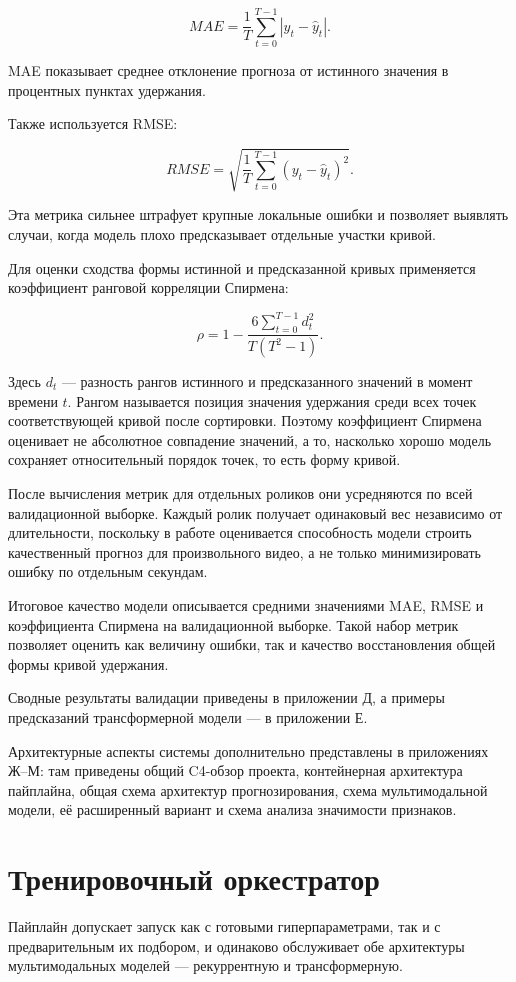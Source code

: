 \documentclass[times]{itmo-student-thesis}
\begin{document}
\[
MAE=\frac{1}{T}\sum_{t=0}^{T-1}|y_t-\hat y_t|.
\]

MAE показывает среднее отклонение прогноза от истинного значения в процентных пунктах удержания.

Также используется RMSE:

\[
RMSE=\sqrt{\frac{1}{T}\sum_{t=0}^{T-1}(y_t-\hat y_t)^2}.
\]

Эта метрика сильнее штрафует крупные локальные ошибки и позволяет выявлять случаи, когда модель плохо предсказывает отдельные участки кривой.

Для оценки сходства формы истинной и предсказанной кривых применяется коэффициент ранговой корреляции Спирмена:

\[
\rho=1-\frac{6\sum_{t=0}^{T-1}d_t^2}{T(T^2-1)}.
\]

Здесь $d_t$ — разность рангов истинного и предсказанного значений в момент времени $t$. Рангом называется позиция значения удержания среди всех точек соответствующей кривой после сортировки. Поэтому коэффициент Спирмена оценивает не абсолютное совпадение значений, а то, насколько хорошо модель сохраняет относительный порядок точек, то есть форму кривой.

После вычисления метрик для отдельных роликов они усредняются по всей валидационной выборке. Каждый ролик получает одинаковый вес независимо от длительности, поскольку в работе оценивается способность модели строить качественный прогноз для произвольного видео, а не только минимизировать ошибку по отдельным секундам.

Итоговое качество модели описывается средними значениями MAE, RMSE и коэффициента Спирмена на валидационной выборке. Такой набор метрик позволяет оценить как величину ошибки, так и качество восстановления общей формы кривой удержания.

Сводные результаты валидации приведены в приложении Д, а примеры предсказаний трансформерной модели — в приложении Е.


Архитектурные аспекты системы дополнительно представлены в приложениях Ж--М: там приведены общий C4-обзор проекта, контейнерная архитектура пайплайна, общая схема архитектур прогнозирования, схема мультимодальной модели, её расширенный вариант и схема анализа значимости признаков.

\section{Тренировочный оркестратор}

Пайплайн допускает запуск как с готовыми гиперпараметрами, так и с предварительным их подбором, и одинаково обслуживает обе архитектуры мультимодальных моделей — рекуррентную и трансформерную.
\end{document}
